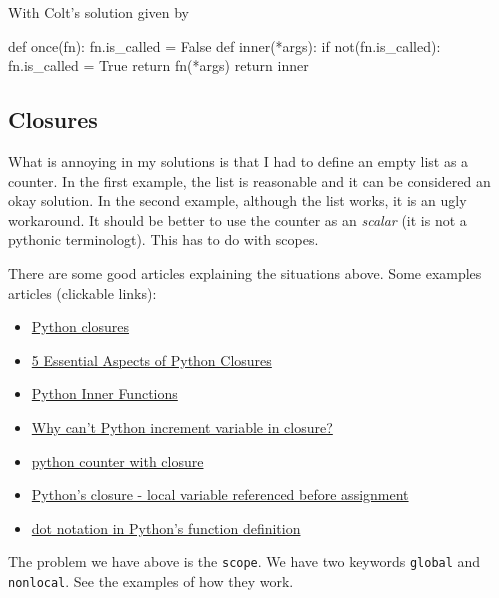 With Colt's solution given by
\begin{listing}{1}
def once(fn):
    fn.is_called = False
    def inner(*args):
        if not(fn.is_called):
            fn.is_called = True
            return fn(*args)
    return inner    
\end{listing}

\subsection{Closures}

What is annoying in my solutions is that I had to define an empty list as a counter. In the first example, the list is reasonable and it can be considered an okay solution. In the second example, although the list works, it is an ugly workaround. It should be better to use the counter as an \emph{scalar} (it is not a pythonic terminologt). This has to do with scopes. 

There are some good articles explaining the situations above. Some examples articles (clickable links):
\begin{itemize}
    \item \href{https://zetcode.com/python/python-closures/}{Python closures}
    \item \href{https://www.linkedin.com/pulse/5-essential-aspects-python-closures-sagar-an/}{5 Essential Aspects of Python Closures}
    \item \href{https://www.geeksforgeeks.org/python-inner-functions/}{Python Inner Functions}
    \item \href{https://stackoverflow.com/questions/21959985/why-cant-python-increment-variable-in-closure}{Why can't Python increment variable in closure?}
    \item \href{https://stackoverflow.com/questions/38693236/python-counter-with-closure}{python counter with closure}
    \item \href{https://stackoverflow.com/questions/36901798/pythons-closure-local-variable-referenced-before-assignment}{Python's closure - local variable referenced before assignment}
    \item \href{https://stackoverflow.com/questions/64946483/dot-notation-in-pythons-function-definition}{dot notation in Python's function definition}
\end{itemize}

The problem we have above is the \verb|scope|. We have two keywords \verb|global| and \verb|nonlocal|. See the examples of how they work. 

